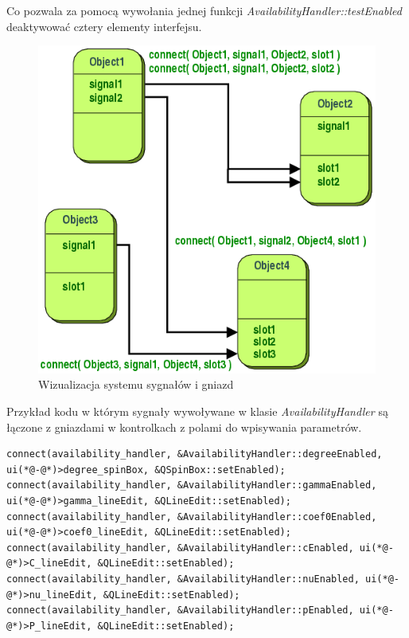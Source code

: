 \documentclass[paper=a4, fontsize=11pt]{scrartcl} %
\numberwithin{equation}{section} %
\numberwithin{figure}{section} %
\begin{document}
    \par Co pozwala za pomocą wywołania jednej funkcji
    \textit{AvailabilityHandler::testEnabled} deaktywować cztery elementy interfejsu.

    \begin{figure}[H]
        \begin{center}
            \includegraphics[scale=0.6]{./img/signal_slots.png}
            \caption{Wizualizacja systemu sygnałów i
            gniazd \cite{qtsignalslot}}
            \label{fig:signal_slots}
        \end{center}
    \end{figure}

\newpage 

    \par Przykład kodu w którym sygnały wywoływane w klasie \textit{AvailabilityHandler} są łączone
    z gniazdami w kontrolkach z polami do wpisywania parametrów.

    \begin{lstlisting}
connect(availability_handler, &AvailabilityHandler::degreeEnabled, ui(*@-@*)>degree_spinBox, &QSpinBox::setEnabled);
connect(availability_handler, &AvailabilityHandler::gammaEnabled, ui(*@-@*)>gamma_lineEdit, &QLineEdit::setEnabled);
connect(availability_handler, &AvailabilityHandler::coef0Enabled, ui(*@-@*)>coef0_lineEdit, &QLineEdit::setEnabled);
connect(availability_handler, &AvailabilityHandler::cEnabled, ui(*@-@*)>C_lineEdit, &QLineEdit::setEnabled);
connect(availability_handler, &AvailabilityHandler::nuEnabled, ui(*@-@*)>nu_lineEdit, &QLineEdit::setEnabled);
connect(availability_handler, &AvailabilityHandler::pEnabled, ui(*@-@*)>P_lineEdit, &QLineEdit::setEnabled);
    \end{lstlisting}
\end{document}
